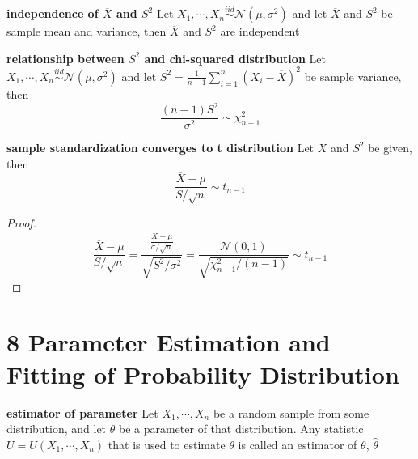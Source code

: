 \documentclass[11pt]{article}
\begin{document}
\begin{theorem*}
  \textbf{independence of $\overline{X}$ and $S^2$}
  Let $X_1, \cdots, X_n\stackrel{iid}{\sim}\mathcal{N}(\mu, \sigma^2) $ and let $\overline{X}$ and $S^2$ be sample mean and variance, then $\overline{X}$ and $S^2$ are independent
\end{theorem*}

\begin{theorem*}
  \textbf{relationship between $S^2$ and chi-squared distribution}
  Let $X_1, \cdots, X_n \stackrel{iid}{\sim} \mathcal{N}(\mu, \sigma^2)$ and let $S^2 = \frac{1}{n-1} \sum_{i=1}^n (X_i - \overline{X})^2$ be sample variance, then
  \[
    \frac{(n-1)S^2}{\sigma^2} \sim \chi_{n-1}^2
  \]
\end{theorem*}

\begin{corollary*}
  \textbf{sample standardization converges to t distribution}
  Let $\overline{X}$ and $S^2$ be given, then
  \[
    \frac{\overline{X} - \mu}{S / \sqrt{n}} \sim t_{n-1}
  \]
  \begin{proof}
    \[
      \frac{\overline{X} - \mu}{S / \sqrt{n}} = \frac{\frac{\overline{X} - \mu}{\sigma / \sqrt{n}}}{\sqrt{S^2 / \sigma^2}} = \frac{\mathcal{N}(0,1)}{\sqrt{\chi_{n-1}^2 / (n-1)}} \sim t_{n-1}
    \]
  \end{proof}
\end{corollary*}


\section*{8 Parameter Estimation and Fitting of Probability Distribution}

\begin{defn*}
  \textbf{estimator of parameter} Let $X_1, \cdots, X_n$ be a random sample from some distribution, and let $\theta$ be a parameter of that distribution. Any statistic $U=U(X_1, \cdots, X_n)$ that is used to estimate $\theta$ is called an estimator of $\theta$, $\hat{\theta}$
\end{defn*}
\end{document}
